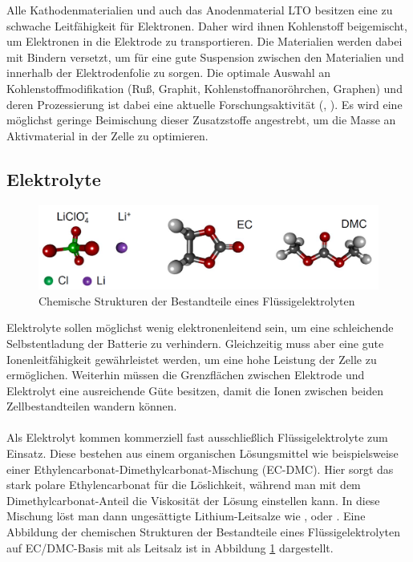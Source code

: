 \documentclass[a4paper, 11pt, headsepline,footsepline,twoside,abstract]{scrbook}
\begin{document}
Alle Kathodenmaterialien und auch das Anodenmaterial LTO besitzen eine zu schwache Leitfähigkeit für Elektronen. Daher wird ihnen Kohlenstoff beigemischt, um Elektronen in die Elektrode zu transportieren. Die Materialien werden dabei mit Bindern versetzt, um für eine gute Suspension zwischen den Materialien und innerhalb der Elektrodenfolie zu sorgen. Die optimale Auswahl an Kohlenstoffmodifikation (Ruß, Graphit, Kohlenstoffnanoröhrchen, Graphen) und deren Prozessierung ist dabei eine aktuelle Forschungsaktivität (\cite{kucinskis2013graphene}, \cite{guo2015microporous}). Es wird eine möglichst geringe Beimischung dieser Zusatzstoffe angestrebt, um die Masse an Aktivmaterial in der Zelle zu optimieren.
\subsection{Elektrolyte}
\begin{figure}
	\centering
	\includegraphics[width=1.0\columnwidth]{images/fluessigelektrolyt.png}
	\caption{Chemische Strukturen der Bestandteile eines Flüssigelektrolyten \cite{bub_skript}}
	\label{fluessigelektrolyt}
\end{figure}
Elektrolyte sollen möglichst wenig elektronenleitend sein, um eine schleichende Selbstentladung der Batterie zu verhindern. Gleichzeitig muss aber eine gute Ionenleitfähigkeit gewährleistet werden, um eine hohe Leistung der Zelle zu ermöglichen. Weiterhin müssen die Grenzflächen zwischen Elektrode und Elektrolyt eine ausreichende Güte besitzen, damit die Ionen zwischen beiden Zellbestandteilen wandern können.
\\\\
Als Elektrolyt kommen kommerziell fast ausschließlich Flüssigelektrolyte zum Einsatz. Diese bestehen aus einem organischen Lösungsmittel wie beispielsweise einer Ethylencarbonat-Dimethylcarbonat-Mischung (EC-DMC). Hier sorgt das stark polare Ethylencarbonat für die Löslichkeit, während man mit dem Dimethylcarbonat-Anteil die Viskosität der Lösung einstellen kann. In diese Mischung löst man dann ungesättigte Lithium-Leitsalze wie ,  oder . Eine Abbildung der chemischen Strukturen der Bestandteile eines Flüssigelektrolyten auf EC/DMC-Basis mit  als Leitsalz ist in Abbildung \ref{fluessigelektrolyt} dargestellt.
\end{document}
